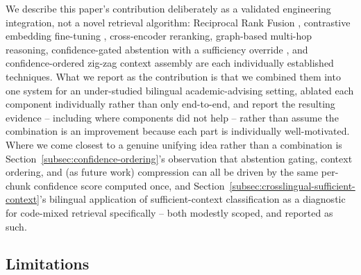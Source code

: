 \documentclass[a4paper,twoside]{article}
\begin{document}
We describe this paper's contribution deliberately as a validated engineering integration, not a novel retrieval algorithm: Reciprocal Rank Fusion \citep{cormack2009}, contrastive embedding fine-tuning \citep{henderson2017mnr}, cross-encoder reranking, graph-based multi-hop reasoning, confidence-gated abstention with a sufficiency override \citep{joren2024}, and confidence-ordered zig-zag context assembly \citep{liu2024lost,jin2024longcontext} are each individually established techniques. What we report as the contribution is that we combined them into one system for an under-studied bilingual academic-advising setting, ablated each component individually rather than only end-to-end, and report the resulting evidence -- including where components did not help -- rather than assume the combination is an improvement because each part is individually well-motivated. Where we come closest to a genuine unifying idea rather than a combination is Section~\ref{subsec:confidence-ordering}'s observation that abstention gating, context ordering, and (as future work) compression can all be driven by the same per-chunk confidence score computed once, and Section~\ref{subsec:crosslingual-sufficient-context}'s bilingual application of sufficient-context classification as a diagnostic for code-mixed retrieval specifically -- both modestly scoped, and reported as such.

\subsection{Limitations}
\end{document}
